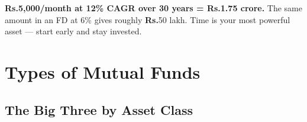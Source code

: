 \documentclass[11pt,a4paper]{article}
\newcommand{\rupee}{\textbf{\textsf{Rs.}}}
\begin{document}
\vspace{5pt}
\begin{tipbox}[title=The Compounding Magic]
\textbf{\rupee{}5,000/month at 12\% CAGR over 30 years = \rupee{}1.75 crore.}  The same amount in an FD at 6\% gives roughly \rupee{}50 lakh.  Time is your most powerful asset --- start early and stay invested.
\end{tipbox}

\section{Types of Mutual Funds}

\subsection{The Big Three by Asset Class}
\end{document}

